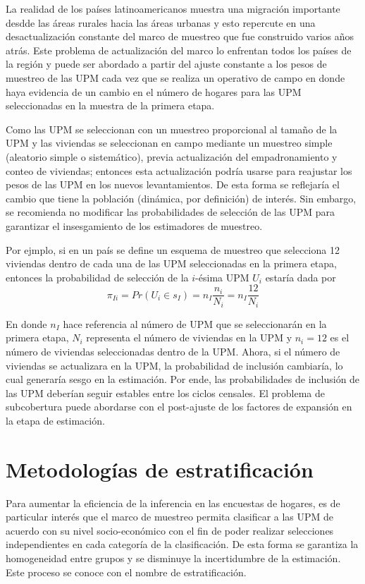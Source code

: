 \documentclass[
  10pt,
  spanish,
]{book}
\begin{document}
La realidad de los países latinoamericanos muestra una migración importante desdde las áreas rurales hacia las áreas urbanas y esto repercute en una desactualización constante del marco de muestreo que fue construido varios años atrás. Este problema de actualización del marco lo enfrentan todos los países de la región y puede ser abordado a partir del ajuste constante a los pesos de muestreo de las UPM cada vez que se realiza un operativo de campo en donde haya evidencia de un cambio en el número de hogares para las UPM seleccionadas en la muestra de la primera etapa.

Como las UPM se seleccionan con un muestreo proporcional al tamaño de la UPM y las viviendas se seleccionan en campo mediante un muestreo simple (aleatorio simple o sistemático), previa actualización del empadronamiento y conteo de viviendas; entonces esta actualización podría usarse para reajustar los pesos de las UPM en los nuevos levantamientos. De esta forma se reflejaría el cambio que tiene la población (dinámica, por definición) de interés. Sin embargo, se recomienda no modificar las probabilidades de selección de las UPM para garantizar el insesgamiento de los estimadores de muestreo.

Por ejmplo, si en un país se define un esquema de muestreo que selecciona 12 viviendas dentro de cada una de las UPM seleccionadas en la primera etapa, entonces la probabilidad de selección de la \(i\)-ésima UPM \(U_i\) estaría dada por
\[
\pi_{Ii}=Pr(U_i \in s_I)=n_I\frac{n_i}{N_i}=n_I\frac{12}{N_i}
\]

En donde \(n_I\) hace referencia al número de UPM que se seleccionarán en la primera etapa, \(N_i\) representa el número de viviendas en la UPM y \(n_i=12\) es el número de viviendas seleccionadas dentro de la UPM. Ahora, si el número de viviendas se actualizara en la UPM, la probabilidad de inclusión cambiaría, lo cual generaría sesgo en la estimación. Por ende, las probabilidades de inclusión de las UPM deberían seguir estables entre los ciclos censales. El problema de subcobertura puede abordarse con el post-ajuste de los factores de expansión en la etapa de estimación.

\hypertarget{metodologuxedas-de-estratificaciuxf3n}{%
\chapter{Metodologías de estratificación}\label{metodologuxedas-de-estratificaciuxf3n}}

Para aumentar la eficiencia de la inferencia en las encuestas de hogares, es de particular interés que el marco de muestreo permita clasificar a las UPM de acuerdo con su nivel socio-económico con el fin de poder realizar selecciones independientes en cada categoría de la clasificación. De esta forma se garantiza la homogeneidad entre grupos y se disminuye la incertidumbre de la estimación. Este proceso se conoce con el nombre de estratificación.
\end{document}
